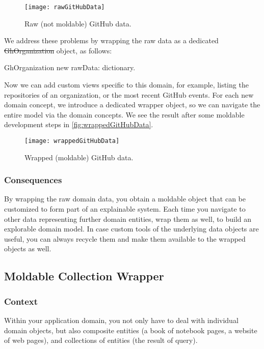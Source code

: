 \documentclass[sigconf]{acmart}
\begin{document}
\begin{figure}[h]
  \texttt{[image: rawGitHubData]}
  \caption{Raw (not moldable) GitHub data.}
  \label{fig:rawGitHubData}
\end{figure}

We address these problems by wrapping the raw data as a dedicated \st{GhOrganization} object, as follows:

\begin{code}
GhOrganization new rawData: dictionary.
\end{code}

Now we can add custom views specific to this domain, for example, listing the repositories of an organization, or the most recent GitHub events.
For each new domain concept, we introduce a dedicated wrapper object, so we can navigate the entire model via the domain concepts.
We see the result after some moldable development steps in \autoref{fig:wrappedGitHubData}.

\begin{figure}[h]
  \texttt{[image: wrappedGitHubData]}
  \caption{Wrapped (moldable) GitHub data.}
  \label{fig:wrappedGitHubData}
\end{figure}

\subsubsection*{Consequences}

By wrapping the raw domain data, you obtain a moldable object that can be customized to form part of an explainable system.
Each time you navigate to other data representing further domain entities, wrap them as well, to build an explorable domain model.
In case custom tools of the underlying data objects are useful, you can always recycle them and make them available to the wrapped objects as well.

\subsection*{Moldable Collection Wrapper}\label{pat:collectionWrapper}

\subsubsection*{Context}
Within your application domain, you not only have to deal with individual domain objects, but also composite entities (\eg a book of notebook pages, a website of web pages), and collections of entities (\eg the result of query).
\end{document}
